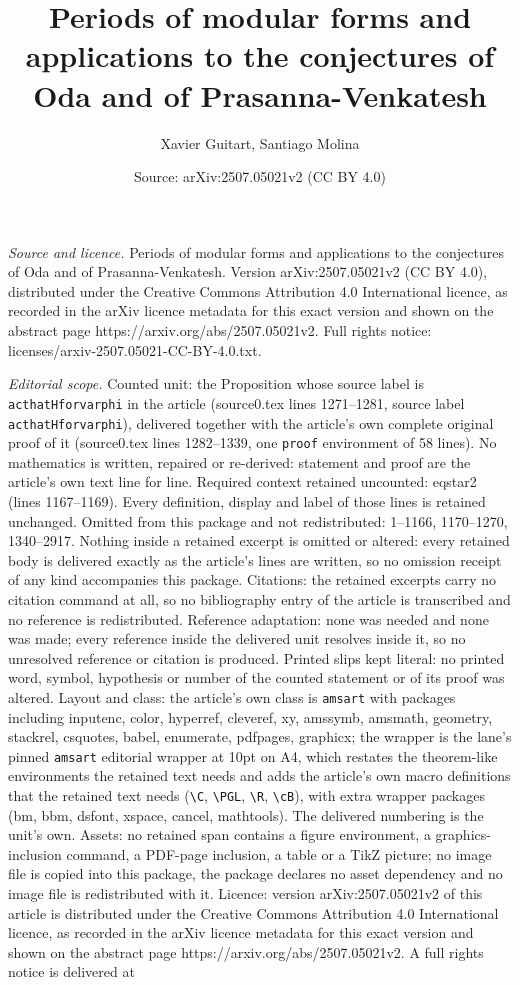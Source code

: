 \documentclass[10pt,a4paper]{amsart}
\title[Periods of modular forms and applications to the conjectures]{Periods of modular forms and applications to the conjectures of Oda and of Prasanna-Venkatesh}
\author{Xavier Guitart, Santiago Molina}
\date{Source: arXiv:2507.05021v2 (CC BY 4.0)}
\begin{document}
\maketitle

\noindent\emph{Source and licence.} Periods of modular forms and applications to the conjectures of Oda and of Prasanna-Venkatesh. Version arXiv:2507.05021v2 (CC BY 4.0), distributed under the Creative Commons Attribution 4.0 International licence, as recorded in the arXiv licence metadata for this exact version and shown on the abstract page https://arxiv.org/abs/2507.05021v2. Full rights notice: licenses/arxiv-2507.05021-CC-BY-4.0.txt.\par\smallskip

\noindent\textit{Editorial scope.} Counted unit: the Proposition whose source label is \texttt{acthatHforvarphi} in the article (source0.tex lines 1271--1281, source label \texttt{acthatHforvarphi}), delivered together with the article's own complete original proof of it (source0.tex lines 1282--1339, one \texttt{proof} environment of 58 lines). No mathematics is written, repaired or re-derived: statement and proof are the article's own text line for line. Required context retained uncounted: eqstar2 (lines 1167--1169). Every definition, display and label of those lines is retained unchanged. Omitted from this package and not redistributed: 1--1166, 1170--1270, 1340--2917. Nothing inside a retained excerpt is omitted or altered: every retained body is delivered exactly as the article's lines are written, so no omission receipt of any kind accompanies this package. Citations: the retained excerpts carry no citation command at all, so no bibliography entry of the article is transcribed and no reference is redistributed. Reference adaptation: none was needed and none was made; every reference inside the delivered unit resolves inside it, so no unresolved reference or citation is produced. Printed slips kept literal: no printed word, symbol, hypothesis or number of the counted statement or of its proof was altered. Layout and class: the article's own class is \texttt{amsart} with packages including inputenc, color, hyperref, cleveref, xy, amssymb, amsmath, geometry, stackrel, csquotes, babel, enumerate, pdfpages, graphicx; the wrapper is the lane's pinned \texttt{amsart} editorial wrapper at 10pt on A4, which restates the theorem-like environments the retained text needs and adds the article's own macro definitions that the retained text needs (\texttt{\textbackslash C}, \texttt{\textbackslash PGL}, \texttt{\textbackslash R}, \texttt{\textbackslash cB}), with extra wrapper packages (bm, bbm, dsfont, xspace, cancel, mathtools). The delivered numbering is the unit's own. Assets: no retained span contains a figure environment, a graphics-inclusion command, a PDF-page inclusion, a table or a TikZ picture; no image file is copied into this package, the package declares no asset dependency and no image file is redistributed with it. Licence: version arXiv:2507.05021v2 of this article is distributed under the Creative Commons Attribution 4.0 International licence, as recorded in the arXiv licence metadata for this exact version and shown on the abstract page https://arxiv.org/abs/2507.05021v2. A full rights notice is delivered at 
\end{document}
